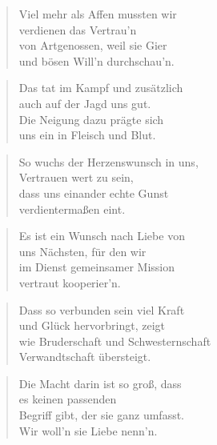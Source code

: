 \documentclass[10pt,a4paper]{article}
\begin{document}
\begin{multicols}{2}
\begin{verse}
Viel mehr als Affen mussten wir \\
verdienen das Vertrau’n \\
von Artgenossen, weil sie Gier \\
und bösen Will’n durchschau’n. \\
\end{verse}

\begin{verse}
Das tat im Kampf und zusätzlich \\
auch auf der Jagd uns gut. \\
Die Neigung dazu prägte sich \\
uns ein in Fleisch und Blut. \\
\end{verse}

\begin{verse}
So wuchs der Herzenswunsch in uns, \\
Vertrauen wert zu sein, \\
dass uns einander echte Gunst \\
verdientermaßen eint. \\
\end{verse}

\begin{verse}
Es ist ein Wunsch nach Liebe von \\
uns Nächsten, für den wir \\
im Dienst gemeinsamer Mission \\
vertraut kooperier’n. \\
\end{verse}

\begin{verse}
Dass so verbunden sein viel Kraft \\
und Glück hervorbringt, zeigt \\
wie Bruderschaft und Schwesternschaft \\
Verwandtschaft übersteigt. \\
\end{verse}

\begin{verse}
Die Macht darin ist so groß, dass \\
es keinen passenden \\
Begriff gibt, der sie ganz umfasst. \\
Wir woll’n sie Liebe nenn’n. \\
\end{verse}


\end{multicols}
\end{document}
